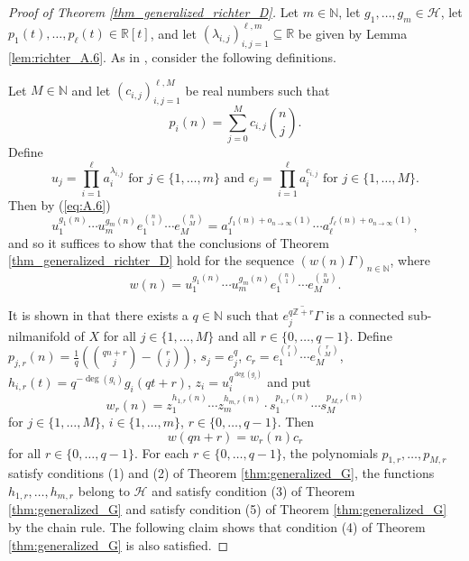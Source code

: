 \documentclass[12pt]{article}
\theoremstyle{plain} %
\theoremstyle{definition} %
\theoremstyle{plain}
\theoremstyle{plain}
\numberwithin{equation}{section}
\newcommand{\N}{\mathbb{N}}
\newcommand{\Z}{\mathbb{Z}}
\newcommand{\R}{\mathbb{R}}
\renewcommand{\subset}{\subseteq}
\newcommand{\1}{\mathbbm{1}}
\newcommand{\oo}{\infty}
\begin{document}
\begin{proof}[Proof of Theorem \ref{thm_generalized_richter_D}]
    Let $m \in \N$, let $g_1,\dots, g_m \in \mathcal{H}$, let $p_1(t),\dots , p_{\ell}(t) \in \R[t]$, and let $(\lambda_{i,j})_{i,j=1}^{\ell,m}\subset \R$ be given by Lemma \ref{lem:richter_A.6}. As in \cite[Section 3]{Richter23}, consider the following definitions. 

    Let $M\in \N$ and let $(c_{i,j})_{i,j=1}^{\ell,M}$ be real numbers such that 
    \begin{equation*}
        p_i(n)=\sum_{j=0}^Mc_{i,j}\binom{n}{j}.
    \end{equation*}
    Define
    \begin{equation*}
        u_j = \prod_{i=1}^{\ell}a_i^{\lambda_{i,j}}\text{ for } j\in \{1,\dots, m\} \text{ and } e_j= \prod_{i=1}^{\ell}a_i^{c_{i,j}}\text{ for } j\in \{1,\dots, M\}.
    \end{equation*}
    Then by (\ref{eq:A.6})
    \begin{equation}\label{eq:change_of_variables_for_nilsequence}
        u_1^{g_1(n)}\cdots u_m^{g_m(n)}e_1^{\binom{n}{1}}\cdots e_M^{\binom{n}{M}} = a_1^{f_1(n)+o_{n\to\oo}(1)}\cdots a_{\ell}^{f_{\ell}(n)+o_{n\to\oo}(1)},
    \end{equation}
    and so it suffices to show that the conclusions of Theorem \ref{thm_generalized_richter_D} hold for the sequence $(w(n)\Gamma)_{n\in \N}$, where
    \begin{equation}
        w(n)= u_1^{g_1(n)}\cdots u_m^{g_m(n)}e_1^{\binom{n}{1}}\cdots e_M^{\binom{n}{M}}.
    \end{equation}

    It is shown in \cite[pg. 441]{Richter23} that there exists a $q\in \N$ such that $\overline{e_j^{q\Z+r}\Gamma}$ is a connected sub-nilmanifold of $X$ for all $j\in \{1,\dots, M\}$ and all $r\in \{0,\dots, q-1\}$. Define $p_{j,r}(n) = \frac{1}{q}\left(\binom{qn+r}{j}-\binom{r}{j}\right)$, $s_j = e_j^q$, $c_r = e_1^{\binom{r}{1}}\cdots e_M^{\binom{r}{M}}$, $h_{i,r}(t) = q^{-\deg(g_i)}g_i(qt+r)$, $z_i = u_i^{q^{\deg(g_i)}}$ and put 
    $$
    w_r(n)=z_1^{h_{1,r}(n)}\cdots z_m^{h_{m,r}(n)}\cdot s_1^{p_{1,r}(n)}\cdots s_M^{p_{M,r}(n)}
    $$
    for $j\in \{1,\dots, M\}$, $i\in \{1,\dots, m\}$, $r\in \{0,\dots, q-1\}$. Then 
    \begin{equation}\label{eq:w_r_equation}
    w(qn+r) = w_r(n)c_r
    \end{equation}
    for all $r\in \{0,\dots, q-1\}$. For each $r\in \{0,\dots, q-1\}$, the polynomials $p_{1,r},\dots, p_{M,r}$ satisfy conditions (1) and (2) of Theorem \ref{thm:generalized_G}, the functions $h_{1,r},\dots, h_{m,r}$ belong to $\mathcal{H}$ and satisfy condition (3) of Theorem \ref{thm:generalized_G} and satisfy condition (5) of Theorem \ref{thm:generalized_G} by the chain rule. The following claim shows that condition (4) of Theorem \ref{thm:generalized_G} is also satisfied.
    

\end{proof}
\end{document}
